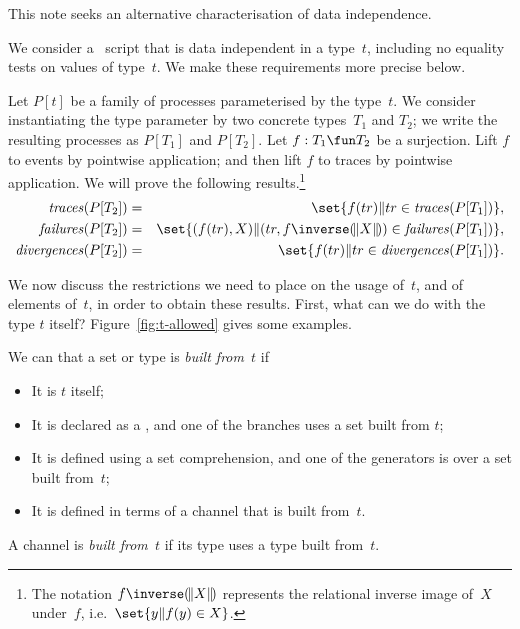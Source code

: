 
This note seeks an alternative characterisation of data independence.

We consider a \CSPm\ script that is data independent in a type~$t$, including
no equality tests on values of type~$t$.  We make these requirements more
precise below.

Let $P[t]$ be a family of processes parameterised by the type~$t$.  We
consider instantiating the type parameter by two concrete types~$T_1$ and
$T_2$; we write the resulting processes as $P[T_1]$ and $P[T_2]$.  Let $f: T_1
\fun T_2$ be a surjection.  Lift $f$ to events by pointwise application; and
then lift $f$ to traces by pointwise application.  We will prove the following
results.\footnote{The notation $f\inverse \banana{X}$ represents the
  relational inverse image of~$X$ under~$f$, i.e.~$\set{y \| f(y) \in X}$.}
%
\begin{eqnarray}
\traces(P[T_2]) & = & \set{f(tr) \| tr \in \traces(P[T_1])},
  \label{eqn:traces} \\
\failures(P[T_2]) & = &
  \set{(f(tr), X) \| (tr, f\inverse \banana{X}) \in \failures(P[T_1])},
  \label{eqn:failures} \\
\divergences(P[T_2]) & = & \set{f(tr) \| tr \in \divergences(P[T_1])}.
\end{eqnarray}


We now discuss the restrictions we need to place on the usage of~$t$, and of
elements of~$t$, in order to obtain these results.  First, what can we do with
the type $t$ itself?  Figure~\ref{fig:t-allowed} gives some examples.
\framebox{\ldots} 

\begin{definition}
We can that a set or type is \emph{built from~$t$} if
%
\begin{itemize}
\item It is $t$ itself;

\item It is declared as a , and one of the branches uses a set
  built from $t$;

\item It is defined using a set comprehension, and one of the generators is
  over a set built from~$t$;

\item It is defined in terms of a channel that is built from~$t$.
\end{itemize}
%
A channel is \emph{built from~$t$} if its type uses a type built from~$t$.
\end{definition}
 
